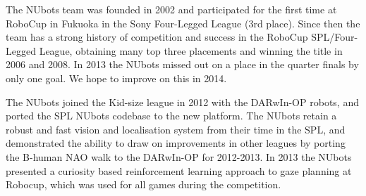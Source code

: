 \documentclass{llncs}
\begin{document}
The NUbots team was founded in 2002 and participated for the first time at RoboCup in Fukuoka in the Sony Four-Legged League (3rd place). Since then the team has  a strong history of competition and success in the RoboCup SPL/Four-Legged League, obtaining many top three placements and winning the title in 2006 and 2008. In 2013 the NUbots missed out on a place in the quarter finals by only one goal. We hope to improve on this in 2014.

The NUbots joined the Kid-size league in 2012 with the DARwIn-OP robots, and ported the SPL NUbots codebase to the new platform. The NUbots retain a robust and fast vision and localisation system from their time in the SPL, and demonstrated the ability to draw on improvements in other leagues by porting the B-human NAO walk to the DARwIn-OP for 2012-2013. In 2013 the NUbots presented a curiosity based reinforcement learning approach to gaze planning at Robocup, which was used for all games during the competition.

\end{document}
